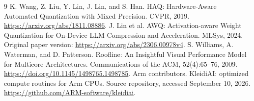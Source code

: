 \documentclass[11pt]{article}
\begin{document}
\begin{thebibliography}{9}
 K. Wang, Z. Liu, Y. Lin, J. Lin, and S. Han.
HAQ: Hardware-Aware Automated Quantization with Mixed Precision.
CVPR, 2019. \url{https://arxiv.org/abs/1811.08886}.
 J. Lin et al.
AWQ: Activation-aware Weight Quantization for On-Device LLM Compression and Acceleration.
MLSys, 2024. Original paper version:
\url{https://arxiv.org/abs/2306.00978v4}.
 S. Williams, A. Waterman, and D. Patterson.
Roofline: An Insightful Visual Performance Model for Multicore Architectures.
Communications of the ACM, 52(4):65--76, 2009.
\url{https://doi.org/10.1145/1498765.1498785}.
 Arm contributors. KleidiAI: optimized compute routines for Arm CPUs.
Source repository, accessed September 10, 2026.
\url{https://github.com/ARM-software/kleidiai}.
\end{thebibliography}
\end{document}
